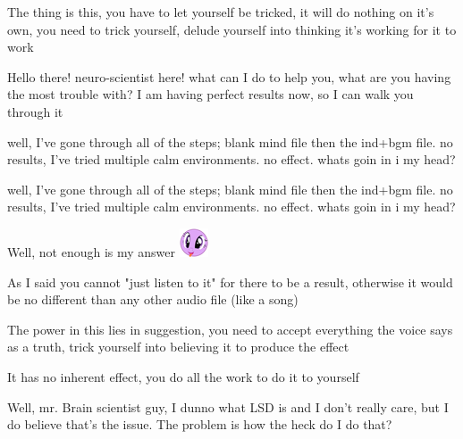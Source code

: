 \documentclass[ebook,12pt,oneside,openany]{memoir}
\newcommand{\mytexttilde}{\raisebox{0.5ex}{\texttildelow}}
\begin{document}
\begin{tcolorbox}[title=Toby]
\begin{tcolorbox}[title=\mytexttilde{}Lawful Sturdy Wing\mytexttilde{}]
\par{The thing is this, you have to let yourself be tricked, it will do nothing on it's own, you need to trick yourself, delude yourself into thinking it's working for it to work}
\newline{}
\newline{}
\newline{}
\par{Hello there! neuro-scientist here! what can I do to help you, what are you having the most trouble with? I am having perfect results now, so I can walk you through it}
\end{tcolorbox}
\par{well, I've gone through all of the steps; blank mind file then the ind+bgm file. no results, I've tried multiple calm environments. no effect. whats goin in i my head?}
\end{tcolorbox}
\begin{tcolorbox}[title=\mytexttilde{}Lawful Sturdy Wing\mytexttilde{},colback=magenta!5!white,colframe=magenta!75!black,coltitle=white]
\begin{tcolorbox}[title=Toby]
\par{well, I've gone through all of the steps; blank mind file then the ind+bgm file. no results, I've tried multiple calm environments. no effect. whats goin in i my head?}
\end{tcolorbox}
\par{Well, not enough is my answer \includegraphics{images/mlp_eW9KEfP.png} }
\par{As I said you cannot "just listen to it" for there to be a result, otherwise it would be no different than any other audio file (like a song) }
\par{The power in this lies in suggestion, you need to accept everything the voice says as a truth, trick yourself into believing it to produce the effect}
\par{It has no inherent effect, you do all the work to do it to yourself}
\end{tcolorbox}
\begin{tcolorbox}[title=Scarletthealicorn,colback=lime!5!white,colframe=lime!75!black,coltitle=white]
\par{Well, mr. Brain scientist guy, I dunno what LSD is and I don't  really care, but I do believe that's the issue.  The problem is how the heck do I do that?}
\end{tcolorbox}
\end{document}

